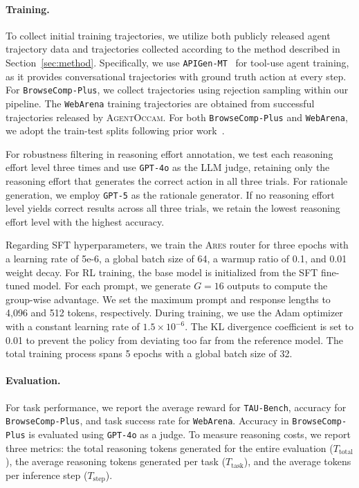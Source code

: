 \documentclass{article}
\newcommand{\ares}{\textsc{Ares}}
\theoremstyle{plain}
\theoremstyle{definition}
\theoremstyle{remark}
\begin{document}


\paragraph{Training.}
To collect initial training trajectories, we utilize both publicly released agent trajectory data and trajectories collected according to the method described in Section~\ref{sec:method}. Specifically, we use \texttt{APIGen-MT}~\citep{prabhakar2025apigen} for tool-use agent training, as it provides conversational trajectories with ground truth action at every step. For \texttt{BrowseComp-Plus}, we collect trajectories using rejection sampling within our pipeline. The \texttt{WebArena} training trajectories are obtained from successful trajectories released by \textsc{AgentOccam}. For both \texttt{BrowseComp-Plus} and \texttt{WebArena}, we adopt the train-test splits following prior work~\citep{sun2025scaling,qi2024webrl,yang2024agentoccam}.

For robustness filtering in reasoning effort annotation, we test each reasoning effort level three times and use \texttt{GPT-4o} as the LLM judge, retaining only the reasoning effort that generates the correct action in all three trials. For rationale generation, we employ \texttt{GPT-5} as the rationale generator. If no reasoning effort level yields correct results across all three trials, we retain the lowest reasoning effort level with the highest accuracy. 

Regarding SFT hyperparameters, we train the {\ares} router for three epochs with a learning rate of 5e-6, a global batch size of 64, a warmup ratio of 0.1, and 0.01 weight decay. For RL training, the base model is initialized from the SFT fine-tuned model. For each prompt, we generate $G=16$ outputs to compute the group-wise advantage. We set the maximum prompt and response lengths to 4,096 and 512 tokens, respectively. During training, we use the Adam optimizer with a constant learning rate of $1.5 \times 10^{-6}$. The KL divergence coefficient is set to 0.01 to prevent the policy from deviating too far from the reference model. The total training process spans 5 epochs with a global batch size of 32.

\paragraph{Evaluation.}
For task performance, we report the average reward for \texttt{TAU-Bench}, accuracy for \texttt{BrowseComp-Plus}, and task success rate for \texttt{WebArena}. Accuracy in \texttt{BrowseComp-Plus} is evaluated using \texttt{GPT-4o} as a judge. To measure reasoning costs, we report three metrics: the total reasoning tokens generated for the entire evaluation ($T_{\text{total}}$), the average reasoning tokens generated per task ($T_{\text{task}}$), and the average tokens per inference step ($T_{\text{step}}$).
\end{document}
